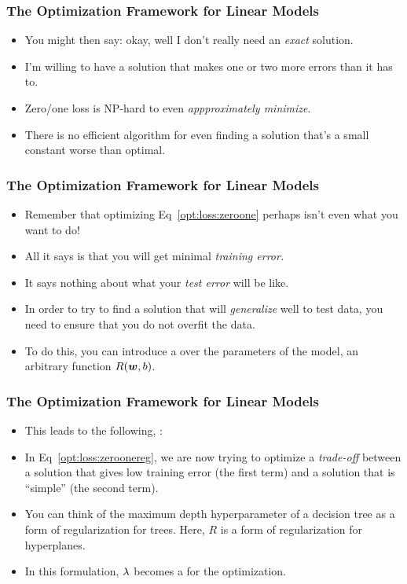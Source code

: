\documentclass[trans]{beamer}
\begin{document}
\begin{frame}
  \frametitle{The Optimization Framework for Linear Models}
\begin{itemize}
\item 
You might then  say: okay, well I don't really need an
\emph{exact} solution.
\item   I'm willing to have a solution that makes one
or two more errors than it has to. 
\item  Zero/one loss is NP-hard to even \emph{appproximately
  minimize}.  
  \item There is no efficient algorithm for even
finding a solution that's a small constant worse than optimal.  
\end{itemize}
\end{frame}


\begin{frame}
  \frametitle{The Optimization Framework for Linear Models}
\begin{itemize}
\item 
Remember that optimizing
Eq~\eqref{opt:loss:zeroone} perhaps isn't even what you want to do!
\item All it says is that you will get minimal \emph{training
  error.}
\item   It says nothing about what your \emph{test error} will be
like.
\item  In order to try to find a solution that will \emph{generalize}
well to test data, you need to ensure that you do not overfit the
data.
\item  To do this, you can introduce a  over the
parameters of the model,  an arbitrary function
$R({\boldsymbol{w}},b)$.  
\end{itemize}
\end{frame}


\begin{frame}
  \frametitle{The Optimization Framework for Linear Models}
\begin{itemize}
\item 
This leads to the following, :
%
%
\item
In Eq~\eqref{opt:loss:zeroonereg}, we are now trying to optimize a
\emph{trade-off} between a solution that gives low training error (the
first term) and a solution that is ``simple'' (the second term). 
\item You
can think of the maximum depth hyperparameter of a decision tree as a
form of regularization for trees.  Here, $R$ is a form of
regularization for hyperplanes.  
\item In this formulation, $\lambda$ becomes a
 for the optimization.
\end{itemize}
\end{frame}
\end{document}
